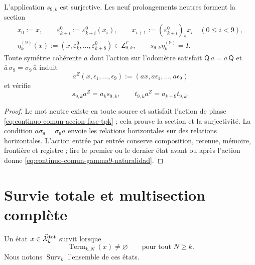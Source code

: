 \begin{proposition}
\label{prop:continuo-comun-gamma9-total-natural}
L'application \(s_{9,k}\) est surjective. Les neuf prolongements neutres forment la section
\begin{equation}
\label{eq:continuo-comun-gamma9-seccion-neutra}
 \begin{gathered}
 x_0:=x,\qquad
 \varepsilon^0_{k+i}:=\varepsilon^0_{k+i}(x_i),\qquad
 x_{i+1}:=(\varepsilon^0_{k+i})_*x_i\quad(0\leq i<9),\\
 \eta^{(9)}_k(x):=
 (x,\varepsilon^0_k,\ldots,\varepsilon^0_{k+8})
 \in\mathsf Z^{\Gamma}_{9,k},
 \qquad s_{9,k}\eta^{(9)}_k=I.
 \end{gathered}
\end{equation}
Toute symétrie cohérente \(a\) dont l'action sur l'odomètre satisfait \(\mathsf Q\,a=\bar a\,\mathsf Q\) et \(\bar a\,\sigma_9=\sigma_9\,\bar a\) induit
\[
 a^Z(x,\epsilon_1,\ldots,\epsilon_9)
 :=(a x,a\epsilon_1,\ldots,a\epsilon_9)
\]
et vérifie
\begin{equation}
\label{eq:continuo-comun-gamma9-naturalidad}
 s_{9,k}a^Z=a_ks_{9,k},
 \qquad
 t_{9,k}a^Z=a_{k+9}t_{9,k}.
\end{equation}
\end{proposition}

\begin{proof}
Le mot neutre existe en toute source et satisfait l'action de phase \eqref{eq:continuo-comun-accion-fase-tpk} ; cela prouve la section et la surjectivité. La condition \(\bar a\sigma_9=\sigma_9\bar a\) envoie les relations horizontales sur des relations horizontales. L'action entrée par entrée conserve composition, retenue, mémoire, frontière et registre ; lire le premier ou le dernier état avant ou après l'action donne \eqref{eq:continuo-comun-gamma9-naturalidad}.
\end{proof}

\section{Survie totale et multisection complète}
\label{sec:continuo-comun-supervivencia}

\begin{definition}
\label{def:continuo-comun-supervivencia}
Un état \(x\in\widehat{\mathcal X}^{\rm tot}_k\) survit lorsque
\begin{equation}
\label{eq:continuo-comun-supervivencia}
 \operatorname{Term}_{k,N}(x)\neq\varnothing
 \qquad\text{pour tout }N\geq k.
\end{equation}
Nous notons \(\operatorname{Surv}_k\) l'ensemble de ces états.
\end{definition}

